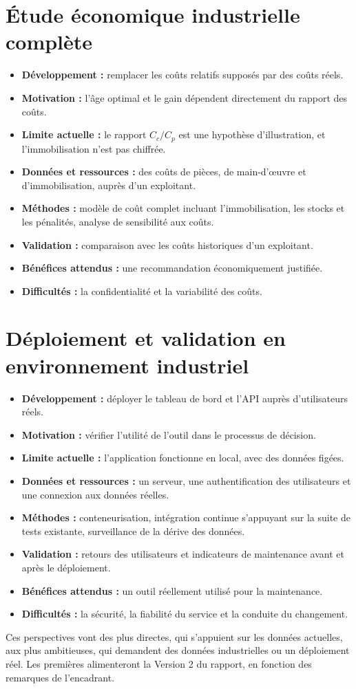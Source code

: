 \section{Étude économique industrielle complète}\label{sec:p-economie}

\begin{itemize}
\item \textbf{Développement :} remplacer les coûts relatifs supposés par des coûts réels.
\item \textbf{Motivation :} l'âge optimal et le gain dépendent directement du rapport des coûts.
\item \textbf{Limite actuelle :} le rapport $C_c / C_p$ est une hypothèse d'illustration, et l'immobilisation n'est pas chiffrée.
\item \textbf{Données et ressources :} des coûts de pièces, de main-d'œuvre et d'immobilisation, auprès d'un exploitant.
\item \textbf{Méthodes :} modèle de coût complet incluant l'immobilisation, les stocks et les pénalités, analyse de sensibilité aux coûts.
\item \textbf{Validation :} comparaison avec les coûts historiques d'un exploitant.
\item \textbf{Bénéfices attendus :} une recommandation économiquement justifiée.
\item \textbf{Difficultés :} la confidentialité et la variabilité des coûts.
\end{itemize}

\section{Déploiement et validation en environnement industriel}\label{sec:p-deploiement}

\begin{itemize}
\item \textbf{Développement :} déployer le tableau de bord et l'API auprès d'utilisateurs réels.
\item \textbf{Motivation :} vérifier l'utilité de l'outil dans le processus de décision.
\item \textbf{Limite actuelle :} l'application fonctionne en local, avec des données figées.
\item \textbf{Données et ressources :} un serveur, une authentification des utilisateurs et une connexion aux données réelles.
\item \textbf{Méthodes :} conteneurisation, intégration continue s'appuyant sur la suite de tests existante, surveillance de la dérive des données.
\item \textbf{Validation :} retours des utilisateurs et indicateurs de maintenance avant et après le déploiement.
\item \textbf{Bénéfices attendus :} un outil réellement utilisé pour la maintenance.
\item \textbf{Difficultés :} la sécurité, la fiabilité du service et la conduite du changement.
\end{itemize}

\chapconclusion

Ces perspectives vont des plus directes, qui s'appuient sur les données actuelles, aux plus ambitieuses, qui demandent des données industrielles ou un déploiement réel. Les premières alimenteront la Version 2 du rapport, en fonction des remarques de l'encadrant.
